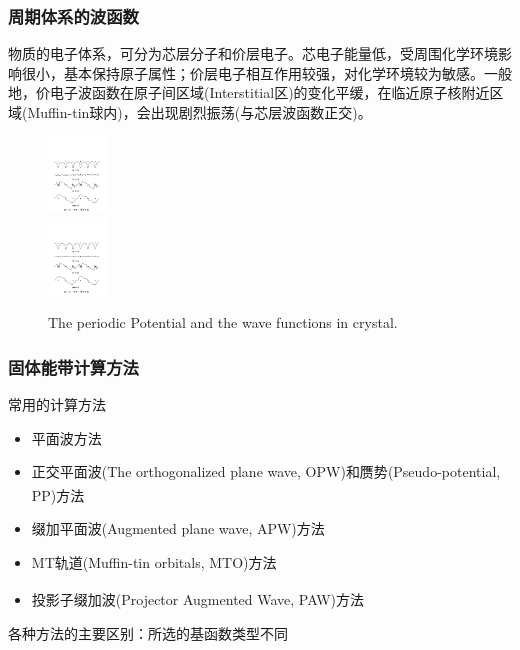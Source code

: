 \documentclass[cjk,slidestop,compress,mathserif,blue]{beamer}
\newcommand{\upcite}[1]{\hspace{0ex}\textsuperscript{\cite{#1}}} %
\begin{document}
\frame
{
\frametitle{周期体系的波函数}
物质的电子体系，可分为芯层分子和价层电子。芯电子能量低，受周围化学环境影响很小，基本保持原子属性；价层电子相互作用较强，对化学环境较为敏感。一般地，价电子波函数在原子间区域(\textrm{Interstitial}区)的变化平缓，在临近原子核附近区域(\textrm{Muffin-tin}球内)，会出现剧烈振荡(与芯层波函数正交)。
\begin{figure}[h!]
\centering
\includegraphics[height=0.8in,width=4.in,viewport=41 433 539 546,clip]{Figures/Pseudo_wave.pdf}\\
\includegraphics[height=0.8in,width=4.in,viewport=41 210 539 339,clip]{Figures/Pseudo_wave.pdf}
\caption{\small \textrm{The periodic Potential and the wave functions in crystal.}}%
\label{Potential-Wave}
\end{figure}
}

\frame
{
\frametitle{固体能带计算方法}
\vskip 10pt
常用的计算方法
\begin{itemize}%
\setlength{\itemsep}{15pt}
	\item	平面波方法
	\item	正交平面波\textrm{(The orthogonalized plane wave, OPW)}和赝势\textrm{(Pseudo-potential, PP)}方法\upcite{Singh_Book,PRB41-7892_1990,JPCM6-8245_1994}
	\item	缀加平面波\textrm{(Augmented plane wave, APW)}方法
	\item	\textrm{MT}轨道\textrm{(Muffin-tin orbitals, MTO)}方法
	\item	投影子缀加波\textrm{(Projector Augmented Wave, PAW)}方法\upcite{PRB50-17953_1994,PRB59-1758_1999}
\end{itemize}
  \vskip 5pt 各种方法的主要区别：所选的基函数类型不同
}
\end{document}
